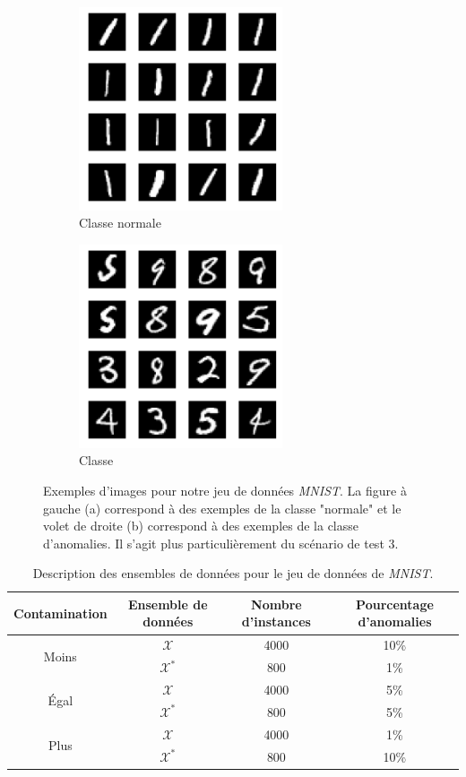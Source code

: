 \begin{figure}[htb]
	\centering
	\begin{subfigure}{6cm}
		\centering\includegraphics[width=6cm]{images/mnist-inliers}
		\caption{Classe normale}
	\end{subfigure}
	\begin{subfigure}{6cm}
		\centering\includegraphics[width=6cm]{images/mnist-outliers}
		\caption{Classe \DIFdelbeginFL {}\DIFdelendFL \DIFaddbeginFL {}\DIFaddendFL }
	\end{subfigure}
	\caption{Exemples d'images pour notre jeu de données \textit{MNIST}. La figure à gauche (a) correspond à des exemples de la classe "normale" et le volet de droite (b) correspond à des exemples de la classe d'anomalies. Il s'agit plus particulièrement du scénario de test 3.}
	\label{fig:mnist}
\end{figure}

\begin{table}[h]
	\centering
	\begin{tabular}{| c | c | c | c |}
		\hline
		\rowcolor{Gray}
		Contamination & Ensemble de données  & Nombre d'instances & Pourcentage d'anomalies  \\
		\hline
		\multirow{2}{*}{Moins} 
		& $\mathcal{X}$ & 4000 & 10\%  \\
		& $\mathcal{X^*}$  & 800 & 1\%  \\ 
		\midrule
		\multirow{2}{*}{Égal} 
		& $\mathcal{X}$ & 4000 & 5\%  \\
		& $\mathcal{X^*}$  & 800 & 5\%  \\ 
		\midrule
		\multirow{2}{*}{Plus} 
		& $\mathcal{X}$ & 4000 & 1\%  \\
		& $\mathcal{X^*}$  & 800 & 10\%  \\ 
		\midrule
	\end{tabular}
	\caption{Description des \DIFdelbeginFL {}\DIFdelendFL \DIFaddbeginFL {}\DIFaddendFL ensembles de données pour le jeu de données de \textit{MNIST}.}
	\label{tab:dataset2}
\end{table}

